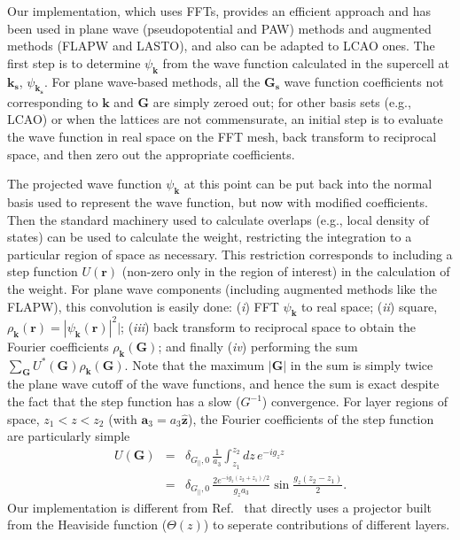 \documentclass[aps,prb,showpacs,twocolumn,reprint,superscriptaddress]{revtex4-1}
\begin{document}
Our implementation, which uses FFTs, provides an efficient approach and has been used in plane wave
(pseudopotential and PAW) methods and augmented methods (FLAPW and LASTO), and also can be adapted to LCAO ones.
The first step is to determine $\psi_\mathbf{k}$ from the wave function calculated in the supercell at $\mathbf{k_s}$,
$\psi_\mathbf{k_s}$. For plane wave-based methods, all the $\mathbf{G_s}$ wave function coefficients not
corresponding to $\mathbf{k}$ and $\mathbf{G}$ are simply zeroed out; for other basis sets (e.g., LCAO) or
when the lattices are not commensurate, an initial step is to evaluate the wave function in real space on the
FFT mesh, back transform to reciprocal space, and then zero out the appropriate coefficients. 

The projected wave function $\psi_\mathbf{k}$ at this point can be put back into the normal basis used to
represent the wave function, but now with modified coefficients. Then the standard machinery used to calculate
overlaps (e.g., local density of states) can be used to calculate the weight, restricting the integration to a
particular region of space as necessary. This restriction corresponds to including a step function
$U(\mathbf{r})$ (non-zero only in the region of interest) in the calculation of the weight. For plane wave
components (including augmented methods like the FLAPW), this convolution is easily done: (\textit{i}) FFT
$\psi_\mathbf{k}$ to real space; (\textit{ii}) square, $\rho_\mathbf{k}(\mathbf{r}) =
|\psi_\mathbf{k}(\mathbf{r})|^2|$; (\textit{iii}) back transform to reciprocal space to obtain the Fourier
coefficients $\rho_\mathbf{k}(\mathbf{G})$; and finally (\textit{iv}) performing the sum $\sum_\mathbf{G}
U^*(\mathbf{G}) \rho_\mathbf{k}(\mathbf{G})$. Note that the maximum $|\mathbf{G}|$ in the sum is simply
twice the plane wave cutoff of the wave functions, and hence the sum is exact despite the fact that the step
function has a slow ($G^{-1}$) convergence. For layer regions of space, $z_1<z<z_2$ (with
$\mathbf{a}_3=a_3 \hat{\mathbf{z}}$),
the Fourier coefficients of the
step function are particularly simple
\begin{eqnarray*}
  U(\mathbf{G})& = &\delta_{G_\|,0} \, \frac{1}{a_3} \int_{z_1}^{z_2} dz \, e^{-ig_z z} \\
               & = &\delta_{G_\|,0} \, \frac{2e^{-ig_z(z_2+z_1)/2}}{g_za_3}
        \sin \frac{g_z(z_2-z_1)}{2} .
\end{eqnarray*}
Our implementation is different from Ref.~ that directly uses a projector built from the Heaviside function ($\Theta(z)$) 
to seperate contributions of different layers.
\end{document}
